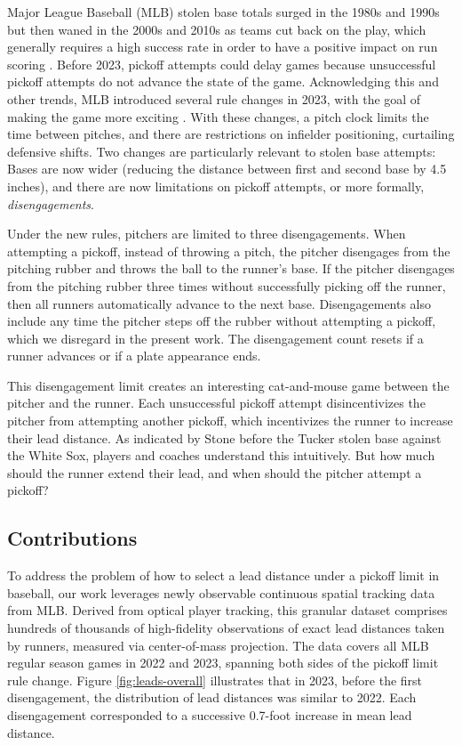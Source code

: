 \documentclass[aoas]{imsart}
\begin{document}
    Major League Baseball (MLB) stolen base totals surged in the 1980s and 1990s but then waned in the 2000s and 2010s as teams cut back on the play, which generally requires a high success rate in order to have a positive impact on run scoring \citep{tango_book_2007}. Before 2023, pickoff attempts could delay games because unsuccessful pickoff attempts do not advance the state of the game. Acknowledging this and other trends, MLB introduced several rule changes in 2023, with the goal of making the game more exciting \citep{castrovince_pitch_2023}. With these changes, a pitch clock limits the time between pitches, and there are restrictions on infielder positioning, curtailing defensive shifts. Two changes are particularly relevant to stolen base attempts: Bases are now wider (reducing the distance between first and second base by 4.5 inches), and there are now limitations on pickoff attempts, or more formally, {\it disengagements}.

    Under the new rules, pitchers are limited to three disengagements. When attempting a pickoff, instead of throwing a pitch, the pitcher disengages from the pitching rubber and throws the ball to the runner's base. If the pitcher disengages from the pitching rubber three times without successfully picking off the runner, then all runners automatically advance to the next base. Disengagements also include any time the pitcher steps off the rubber without attempting a pickoff, which we disregard in the present work. The disengagement count resets if a runner advances or if a plate appearance ends.

    This disengagement limit creates an interesting cat-and-mouse game between the pitcher and the runner. Each unsuccessful pickoff attempt disincentivizes the pitcher from attempting another pickoff, which incentivizes the runner to increase their lead distance. As indicated by Stone before the Tucker stolen base against the White Sox, players and coaches understand this intuitively. But how much should the runner extend their lead, and when should the pitcher attempt a pickoff?

    \subsection{Contributions}

    
    To address the problem of how to select a lead distance under a pickoff limit in baseball, our work leverages newly observable continuous spatial tracking data from MLB. Derived from optical player tracking, this granular dataset comprises hundreds of thousands of high-fidelity observations of exact lead distances taken by runners, measured via center-of-mass projection. The data covers all MLB regular season games in 2022 and 2023, spanning both sides of the pickoff limit rule change. Figure \ref{fig:leads-overall} illustrates that in 2023, before the first disengagement, the distribution of lead distances was similar to 2022. Each disengagement corresponded to a successive 0.7-foot increase in mean lead distance.
\end{document}
